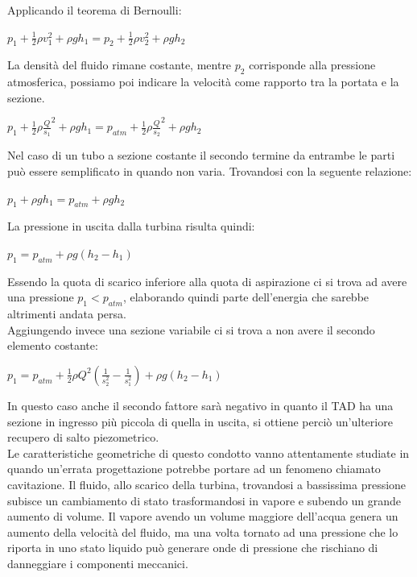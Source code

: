 Applicando il teorema di Bernoulli:
\begin{center}
    {\large$p_1+\frac{1}{2}\rho v_1^2 + \rho g h_1 = p_2+\frac{1}{2}\rho v_2^2 + \rho g h_2$}
\end{center}
La densità del fluido rimane costante, mentre {\large$p_2$} corrisponde alla pressione atmosferica, possiamo poi indicare la velocità come rapporto tra la portata e la sezione.
\begin{center}
    {\large$p_1+\frac{1}{2}\rho \frac{Q}{s_1}^2 + \rho g h_1 = p_{atm}+\frac{1}{2}\rho \frac{Q}{s_2}^2 + \rho g h_2$}
\end{center}
Nel caso di un tubo a sezione costante il secondo termine da entrambe le parti può essere semplificato in quando non varia. Trovandosi con la seguente relazione:
\begin{center}
    {\large$p_1 + \rho g h_1 = p_{atm}+ \rho g h_2$}
\end{center}
La pressione in uscita dalla turbina risulta quindi:
\begin{center}
    {\large$p_1 = p_{atm} + \rho g (h_2 - h_1)$}
\end{center}
Essendo la quota di scarico inferiore alla quota di aspirazione ci si trova ad avere una pressione {\large$p_1<p_{atm}$}, elaborando quindi parte dell'energia che sarebbe altrimenti andata persa.\\
Aggiungendo invece una sezione variabile ci si trova a non avere il secondo elemento costante:
\begin{center}
    {\large$p_1 = p_{atm} + \frac{1}{2}\rho Q^2 (\frac{1}{s_2^2} - \frac{1}{s_1^2}) + \rho g (h_2 - h_1)$}
\end{center}
In questo caso anche il secondo fattore sarà negativo in quanto il TAD ha una sezione in ingresso più piccola di quella in uscita, si ottiene perciò un'ulteriore recupero di salto piezometrico.\\
Le caratteristiche geometriche di questo condotto vanno attentamente studiate in quando un'errata progettazione potrebbe portare ad un fenomeno chiamato cavitazione.
Il fluido, allo scarico della turbina, trovandosi a bassissima pressione subisce un cambiamento di stato trasformandosi in vapore e subendo un grande aumento di volume.
Il vapore avendo un volume maggiore dell'acqua genera un aumento della velocità del fluido, ma una volta tornato ad una pressione che lo riporta in uno stato liquido può generare onde di pressione che rischiano di danneggiare i componenti meccanici.
\vfill
\newpage
